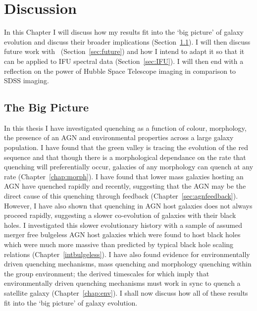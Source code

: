 \chapter{Discussion}\label{chap:discussion}

In this Chapter I will discuss how my results fit into the `big picture' of galaxy evolution and discuss their broader implications (Section~\ref{sec:bigpic}). I will then discuss future work with \starpy\ (Section~\ref{sec:future}) and how I intend to adapt it so that it can be applied to IFU spectral data (Section~\ref{sec:IFU}). I will then end with a reflection on the power of Hubble Space Telescope imaging in comparison to SDSS imaging. 


\section{The Big Picture}\label{sec:bigpic}

In this thesis I have investigated quenching as a function of colour, morphology, the presence of an AGN and environmental properties across a large galaxy population. I have found that the green valley is tracing the evolution of the red sequence and that though there is a morphological dependance on the rate that quenching will preferentially occur, galaxies of any morphology can quench at any rate (Chapter~\ref{chap:morph}). I have found that lower mass galaxies hosting an AGN have quenched rapidly and recently, suggesting that the AGN may be the direct cause of this quenching through feedback (Chapter~\ref{sec:agnfeedback}). However, I have also shown that quenching in AGN host galaxies does not always proceed rapidly, suggesting a slower co-evolution of galaxies with their black holes. I investigated this slower evolutionary history with a sample of assumed merger free bulgeless AGN host galaxies which were found to host black holes which were much more massive than predicted by typical black hole scaling relations (Chapter~\ref{intbulgeless}). I have also found evidence for environmentally driven quenching mechanisms, mass quenching and morphology quenching within the group environment; the derived timescales for which imply that environmentally driven quenching mechanisms must work in sync to quench a satellite galaxy (Chapter~\ref{chap:env}). I shall now discuss how all of these results fit into the `big picture' of galaxy evolution. 

